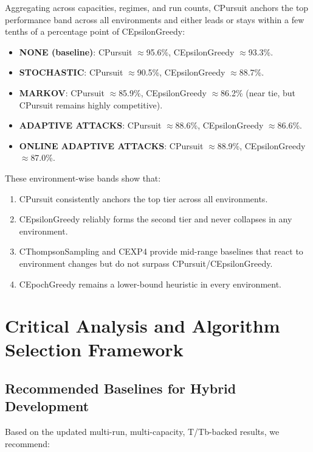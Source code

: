 \documentclass[12pt,a4paper]{article}
\begin{document}
Aggregating across capacities, regimes, and run counts, CPursuit anchors the top performance band across all environments and either leads or stays within a few tenths of a percentage point of CEpsilonGreedy:

\begin{itemize}
\item \textbf{NONE (baseline)}: CPursuit $\approx$95.6\%, CEpsilonGreedy $\approx$93.3\%.
\item \textbf{STOCHASTIC}: CPursuit $\approx$90.5\%, CEpsilonGreedy $\approx$88.7\%.
\item \textbf{MARKOV}: CPursuit $\approx$85.9\%, CEpsilonGreedy $\approx$86.2\% (near tie, but CPursuit remains highly competitive).
\item \textbf{ADAPTIVE ATTACKS}: CPursuit $\approx$88.6\%, CEpsilonGreedy $\approx$86.6\%.
\item \textbf{ONLINE ADAPTIVE ATTACKS}: CPursuit $\approx$88.9\%, CEpsilonGreedy $\approx$87.0\%.
\end{itemize}

These environment-wise bands show that:

\begin{enumerate}
\item CPursuit consistently anchors the top tier across all environments.
\item CEpsilonGreedy reliably forms the second tier and never collapses in any environment.
\item CThompsonSampling and CEXP4 provide mid-range baselines that react to environment changes but do not surpass CPursuit/CEpsilonGreedy.
\item CEpochGreedy remains a lower-bound heuristic in every environment.
\end{enumerate}

\newpage
\section{Critical Analysis and Algorithm Selection Framework}

\subsection{Recommended Baselines for Hybrid Development}

Based on the updated multi-run, multi-capacity, T/Tb-backed results, we recommend:
\end{document}

